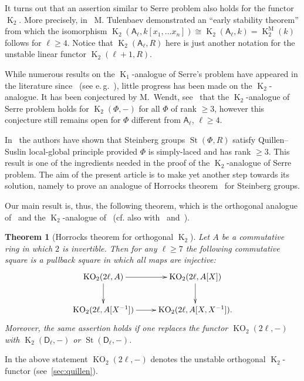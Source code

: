 \documentclass[oneside, 8pt]{amsart}
\newtheorem{theorem}{Theorem}
\theoremstyle{remark}
\theoremstyle{definition}
\numberwithin{lemma}{section}
\numberwithin{prop}{section}
\numberwithin{corollary}{section}
\numberwithin{externaltheorem}{section}
\DeclareMathOperator{\St}{St}
\DeclareMathOperator{\K}{K}
\DeclareMathOperator{\KO}{KO}
\newcommand{\inv}{^{-1}}
\newcommand{\rA}{\mathsf{A}}
\newcommand{\rD}{\mathsf{D}}
\numberwithin{equation}{section}
\begin{document}
It turns out that an assertion similar to Serre problem also holds for the functor $\K_2$. More precisely, in~\cite{Tu83} M. Tulenbaev demonstrated an ``early stability theorem'' from which the isomorphism $\K_2(\rA_\ell, k[x_1, \ldots x_n]) \cong \K_2(\rA_\ell, k) = \K^\mathrm{M}_2(k)$ follows for $\ell \geq 4$. Notice that $\K_2(\rA_\ell, R)$ here is just another notation for the unstable linear functor $\K_2(\ell+1, R)$.

While numerous results on the $\K_1$-analogue of Serre's problem have appeared in the literature since~\cite{Su77} (see e.\,g.~\cite{Su82, Abe83, St-poly, St-Ded}), little progress has been made on the $\K_2$-analogue. It has been conjectured by M.~Wendt, see~\cite[Vermutung~6.22]{Vo11} that the $\K_2$-analogue of Serre problem holds for $\K_2(\Phi, -)$ for all $\Phi$ of rank $\geq 3$, however this conjecture still remains open for $\Phi$ different from $\rA_\ell$, $\ell \geq 4$.

In~\cite{LS17} the authors have shown that Steinberg groups $\St(\Phi, R)$ satisfy Quillen--Suslin local-global principle provided $\Phi$ is simply-laced and has rank $\geq 3$. This result is one of the ingredients needed in the proof of the $\K_2$-analogue of Serre problem. The aim of the present article is to make yet another step towards its solution, namely to prove an analogue of Horrocks theorem~\cite{Ho64} for Steinberg groups.

Our main result is, thus, the following theorem, which is the orthogonal analogue of~\cite[Theorem~5.1]{Tu83} and the $\K_2$-analogue of~\cite[Theorem~6.8]{Su82} (cf. also with~\cite[Theorem~VI.5.2]{Lam10} and~\cite[Theorem~1.1]{St-poly}).
\begin{theorem}[Horrocks theorem for orthogonal $\K_2$]\label{thm:main} Let $A$ be a commutative ring in which $2$ is invertible. Then for any $\ell \geq 7$ the following commutative square is a pullback square in which all maps are injective:
\begin{equation} \nonumber
  \xymatrix{ \KO_2(2\ell, A) \ar[r] \ar[d] & \KO_2(2\ell, A[X]) \ar[d] \\ \KO_2(2\ell, A[X\inv]) \ar[r] & \KO_2(2\ell, A[X, X\inv]).}  
\end{equation} 
Moreover, the same assertion holds if one replaces the functor $\KO_2(2\ell, -)$ with $\K_2(\rD_\ell, -)$ or $\St(\rD_\ell, -)$. \end{theorem}
In the above statement $\KO_2(2\ell, -)$ denotes the unstable orthogonal $\K_2$-functor (see~\cref{sec:quillen}).
\end{document}
